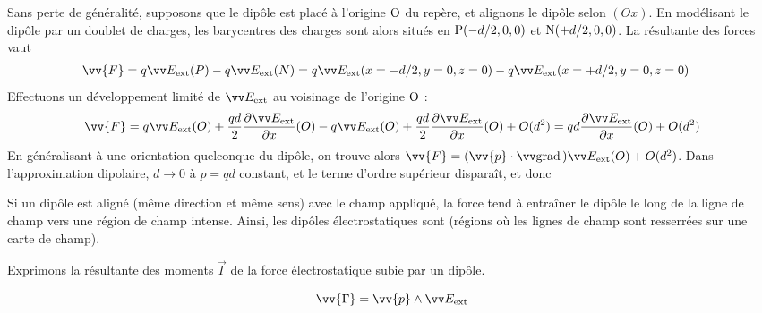 \documentclass[12pt,fancy]{cours}
\begin{document}
\begin{demo}
 Sans perte de généralité, supposons que le dipôle est placé à l'origine $\rm O$ du repère, et alignons le dipôle selon $(Ox)$. En modélisant le dipôle par un doublet de charges, les barycentres des charges sont alors situés en ${\rm P}(-d/2,0,0)$ et ${\rm N}(+d/2,0,0)$. La résultante des forces vaut 
\begin{equation}
  \begin{split}
    \vv{F}=q\Eext(P)-q\Eext(N) & = q \Eext(x = -d/2,y = 0,z = 0)- q \Eext(x = +d/2,y = 0, z= 0 )
  \end{split}
\end{equation}
Effectuons un développement limité de $\Eext$ au voisinage de l'origine $\rm O$ :
\begin{equation}
  \begin{split}
    \vv{F} =  q \Eext(O) + \frac{qd}{2}\dr{\Eext}{x}(O) - q \Eext(O) + \frac{qd}{2} \dr{\Eext}{x}(O) + O(d^2) 
     = q d\dr{\Eext}{x}(O) + O(d^2)
  \end{split}
\end{equation}
En généralisant à une orientation quelconque du dipôle, on trouve alors $\vv{F}=(\vv{p}\cdot\grad{})\Eext(O) + O(d^2)$. Dans l'approximation dipolaire, $d \rightarrow 0$ à $p=qd$ constant, et le terme d'ordre supérieur disparaît, et donc 
\end{demo}

Si un dipôle est aligné (même direction et même sens) avec le champ appliqué, la force tend à entraîner le dipôle le long de la ligne de champ vers une région de champ intense. Ainsi, les dipôles électrostatiques sont  (régions où les lignes de champ sont resserrées sur une carte de champ).


 Exprimons la résultante des moments $\Vec{\Gamma}$ de la force électrostatique subie par un dipôle.
\begin{theorem}
\begin{equation*}
\vv{\Gamma}=\vv{p}\pv\Eext
\end{equation*}
\end{theorem}
\end{document}
